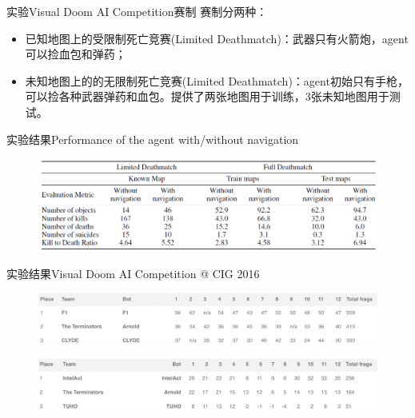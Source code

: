 \documentclass[10pt]{beamer}
\begin{document}
	\begin{frame}{实验}{Visual Doom AI Competition赛制}
		赛制分两种：
		\begin{itemize}
			\item 已知地图上的受限制死亡竞赛(Limited Deathmatch)：武器只有火箭炮，agent可以捡血包和弹药；
			
			\item 未知地图上的的无限制死亡竞赛(Limited Deathmatch)：agent初始只有手枪，可以捡各种武器弹药和血包。提供了两张地图用于训练，3张未知地图用于测试。
		\end{itemize}
	\end{frame}

	\begin{frame}{实验结果}{Performance of the agent with/without navigation}
		\begin{figure}
			\centering
			\includegraphics[width=0.9\linewidth]{pictures/fps-exper-result-1}
		\end{figure}
	\end{frame}

	\begin{frame}{实验结果}{Visual Doom AI Competition @ CIG 2016}
		\begin{figure}
			\centering
			\includegraphics[width=0.9\linewidth]{pictures/fps-exper-result-2}
		\end{figure}
		\begin{figure}
			\centering
			\includegraphics[width=0.9\linewidth]{pictures/fps-exper-result-3}
		\end{figure}
	\end{frame}
\end{document}
